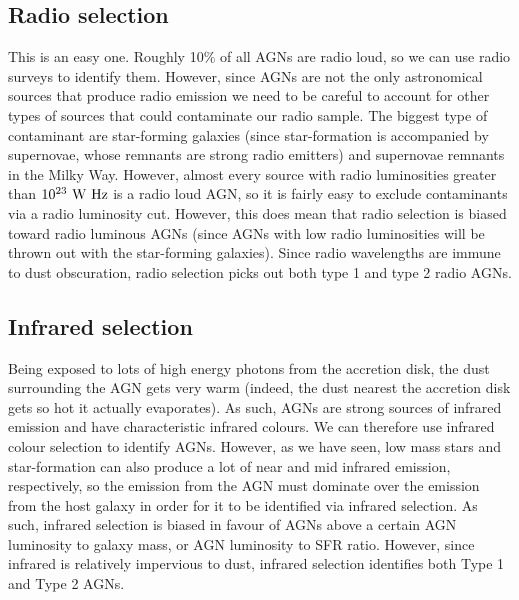 \documentclass[11pt]{article}
\begin{document}
\subsection{Radio selection}
This is an easy one. Roughly 10\% of all AGNs are radio loud, so we
can use radio surveys to identify them. However, since AGNs are not
the only astronomical sources that produce radio emission we need to
be careful to account for other types of sources that could
contaminate our radio sample. The biggest type of contaminant are
star-forming galaxies (since star-formation is accompanied by
supernovae, whose remnants are strong radio emitters) and supernovae
remnants in the Milky Way. However, almost every source with radio
luminosities greater than $10^{23}~{\rm W~Hz}$ is a radio loud AGN, so
it is fairly easy to exclude contaminants via a radio luminosity
cut. However, this does mean that radio selection is biased toward
radio luminous AGNs (since AGNs with low radio luminosities will be
thrown out with the star-forming galaxies). Since radio wavelengths
are immune to dust obscuration, radio selection picks out both type 1
and type 2 radio AGNs.

\subsection{Infrared selection}
Being exposed to lots of high energy photons from the accretion disk,
the dust surrounding the AGN gets very warm (indeed, the dust nearest
the accretion disk gets so hot it actually evaporates). As such, AGNs
are strong sources of infrared emission and have characteristic
infrared colours. We can therefore use infrared colour selection to
identify AGNs. However, as we have seen, low mass stars and
star-formation can also produce a lot of near and mid infrared
emission, respectively, so the emission from the AGN must dominate
over the emission from the host galaxy in order for it to be
identified via infrared selection. As such, infrared selection is
biased in favour of AGNs above a certain AGN luminosity to galaxy
mass, or AGN luminosity to SFR ratio. However, since infrared is
relatively impervious to dust, infrared selection identifies both Type
1 and Type 2 AGNs.
\end{document}
